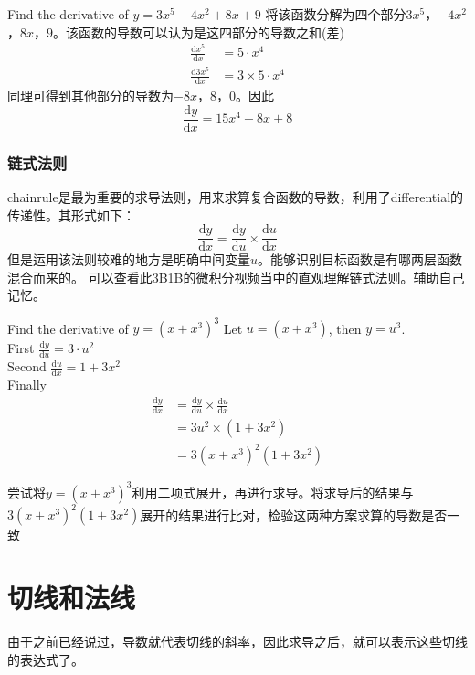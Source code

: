 \begin{ExampleBox}
Find the derivative of $y=3x^5-4x^2+8x+9$
\tcblower
将该函数分解为四个部分$3x^5$，$-4x^2$，$8x$，$9$。该函数的导数可以认为是这四部分的导数之和(差)
\begin{align*}
\frac{\mathrm{d} x^5}{\mathrm{d} x} &= 5\cdot x^4\\
\frac{\mathrm{d} 3x^5}{\mathrm{d} x}&= 3\times 5\cdot x^4
\end{align*}
同理可得到其他部分的导数为$-8x$，$8$，$0$。因此
\[
	\frac{\mathrm{d} y}{\mathrm{d} x}=15x^4-8x+8
\]
\end{ExampleBox}

\subsubsection*{链式法则}
\gls{chainrule}是最为重要的求导法则，用来求算复合函数的导数，利用了differential的传递性。其形式如下：
\[
	\frac{\mathrm{d} y}{\mathrm{d} x} =\frac{\mathrm{d} y}{\mathrm{d} u}\times \frac{\mathrm{d} u}{\mathrm{d} x}  
\]
但是运用该法则较难的地方是明确中间变量$u$。能够识别目标函数是有哪两层函数混合而来的。
可以查看此\href{https://www.bilibili.com/video/BV1qW411N7FU}{3B1B}的微积分视频当中的\href{https://www.bilibili.com/video/BV1qW411N7FU?p=4}{直观理解链式法则}。辅助自己记忆。

\begin{ExampleBox}
Find the derivative of $y=(x+x^3)^3$
\tcblower
Let $u=(x+x^3)$, then $y=u^3$.\\
First $\frac{\mathrm{d} y}{\mathrm{d} u} = 3\cdot u^2$\\
Second $\frac{\mathrm{d} u}{\mathrm{d} x} = 1+3x^2$\\
Finally 
\begin{align*}
\frac{\mathrm{d} y}{\mathrm{d} x} &=\frac{\mathrm{d} y}{\mathrm{d} u}\times \frac{\mathrm{d} u}{\mathrm{d} x}\\
		&=3u^2\times (1+3x^2)\\
		&=3(x+x^3)^2(1+3x^2)
\end{align*} 
\end{ExampleBox}

\begin{TaskBox}
尝试将$y=(x+x^3)^3$利用二项式展开，再进行求导。将求导后的结果与$3(x+x^3)^2(1+3x^2)$展开的结果进行比对，检验这两种方案求算的导数是否一致
\end{TaskBox}
\clearpage

\section{切线和法线}
\label{sec:Tangent Line}
由于之前已经说过，导数就代表切线的斜率，因此求导之后，就可以表示这些切线的表达式了。

